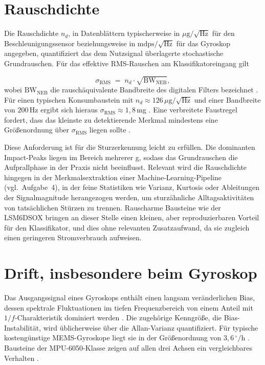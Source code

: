 \documentclass[11pt,a4paper,oneside]{report}
\begin{document}
\section{Rauschdichte}
\label{sec:noise}
Die Rauschdichte $n_{d}$, in Datenblättern typischerweise in
$\mu\mathrm{g}/\sqrt{\mathrm{Hz}}$ für den Beschleunigungssensor
beziehungsweise in $\mathrm{mdps}/\sqrt{\mathrm{Hz}}$ für das Gyroskop
angegeben, quantifiziert das dem Nutzsignal überlagerte stochastische
Grundrauschen. Für das effektive RMS-Rauschen am Klassifikatoreingang
gilt

\begin{equation}
\sigma_{\mathrm{RMS}} \;=\; n_{d} \cdot \sqrt{\mathrm{BW}_{\mathrm{NEB}}},
\label{eq:noise}
\end{equation}
wobei $\mathrm{BW}_{\mathrm{NEB}}$ die rauschäquivalente Bandbreite des
digitalen Filters bezeichnet \cite{arar2022noise}. Für einen typischen
Konsumbaustein mit $n_{d} \approx 126\,\mu\mathrm{g}/\sqrt{\mathrm{Hz}}$
und einer Bandbreite von $200$\,Hz ergibt sich hieraus
$\sigma_{\mathrm{RMS}} \approx 1{,}8$\,mg \cite{arar2022noise}. Eine
verbreitete Faustregel fordert, dass das kleinste zu detektierende
Merkmal mindestens eine Größenordnung über $\sigma_{\mathrm{RMS}}$
liegen sollte \cite{arar2022noise}.

Diese Anforderung ist für die Sturzerkennung leicht zu erfüllen. Die
dominanten Impact-Peaks liegen im Bereich mehrerer g, sodass das
Grundrauschen die Aufprallphase in der Praxis nicht beeinflusst. Relevant
wird die Rauschdichte hingegen in der Merkmalsextraktion einer
Machine-Learning-Pipeline (vgl.\ Aufgabe~4), in der feine Statistiken wie
Varianz, Kurtosis oder Ableitungen der Signalmagnitude herangezogen
werden, um sturzähnliche Alltagsaktivitäten von tatsächlichen
Stürzen zu trennen. Rauscharme Bausteine wie der LSM6DSOX
\cite{st_lsm6dsox} bringen an dieser Stelle einen kleinen, aber
reproduzierbaren Vorteil für den Klassifikator, und dies ohne
relevanten Zusatzaufwand, da sie zugleich einen geringeren
Stromverbrauch aufweisen.

\section{Drift, insbesondere beim Gyroskop}
\label{sec:drift}
Das Ausgangssignal eines Gyroskops enthält einen langsam
veränderlichen Bias, dessen spektrale Fluktuationen im tiefen
Frequenzbereich von einem Anteil mit $1/f$-Charakteristik dominiert werden
\cite{vagner2013allan}. Die zugehörige Kenngröße, die
Bias-Instabilität, wird üblicherweise über die Allan-Varianz
quantifiziert. Für typische kostengünstige \ac{MEMS}-Gyroskope liegt
sie in der Größenordnung von $3{,}6\,^{\circ}/\mathrm{h}$
\cite{gakstatter2017biasdrift}. Bausteine der MPU-6050-Klasse zeigen auf
allen drei Achsen ein vergleichbares Verhalten
\cite{ilyas2020mpu6050allan}.
\end{document}
